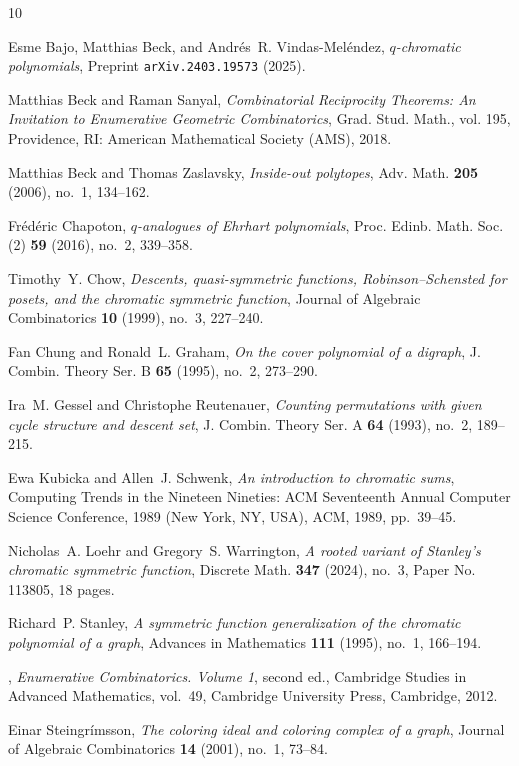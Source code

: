 \documentclass[11pt]{amsart}
\begin{document}
\begin{thebibliography}{10}

Esme Bajo, Matthias Beck, and Andrés~R. Vindas-Meléndez, \emph{$q$-chromatic
  polynomials}, Preprint {\tt arXiv.2403.19573} (2025).

Matthias Beck and Raman Sanyal, \emph{Combinatorial {R}eciprocity {T}heorems:
  {An} {I}nvitation to {E}numerative {G}eometric {C}ombinatorics}, Grad. Stud.
  Math., vol. 195, Providence, RI: American Mathematical Society (AMS), 2018.

Matthias Beck and Thomas Zaslavsky, \emph{Inside-out polytopes}, Adv. Math.
  \textbf{205} (2006), no.~1, 134--162.

Fr\'{e}d\'{e}ric Chapoton, \emph{{$q$}-analogues of {E}hrhart polynomials},
  Proc. Edinb. Math. Soc. (2) \textbf{59} (2016), no.~2, 339--358.

Timothy~Y. Chow, \emph{Descents, quasi-symmetric functions,
  {R}obinson--{S}chensted for posets, and the chromatic symmetric function},
  Journal of Algebraic Combinatorics \textbf{10} (1999), no.~3, 227--240.

Fan Chung and Ronald~L. Graham, \emph{On the cover polynomial of a digraph}, J.
  Combin. Theory Ser. B \textbf{65} (1995), no.~2, 273--290.

Ira~M. Gessel and Christophe Reutenauer, \emph{Counting permutations with given
  cycle structure and descent set}, J. Combin. Theory Ser. A \textbf{64}
  (1993), no.~2, 189--215.

Ewa Kubicka and Allen~J. Schwenk, \emph{An introduction to chromatic sums},
  Computing Trends in the Nineteen Nineties: ACM Seventeenth Annual Computer
  Science Conference, 1989 (New York, NY, USA), ACM, 1989, pp.~39--45.

Nicholas~A. Loehr and Gregory~S. Warrington, \emph{A rooted variant of
  {S}tanley's chromatic symmetric function}, Discrete Math. \textbf{347}
  (2024), no.~3, Paper No. 113805, 18 pages.

Richard~P. Stanley, \emph{A symmetric function generalization of the chromatic
  polynomial of a graph}, Advances in Mathematics \textbf{111} (1995), no.~1,
  166--194.

\bysame, \emph{Enumerative {C}ombinatorics. {V}olume 1}, second ed., Cambridge
  Studies in Advanced Mathematics, vol.~49, Cambridge University Press,
  Cambridge, 2012.

Einar Steingr{\'i}msson, \emph{The coloring ideal and coloring complex of a
  graph}, Journal of Algebraic Combinatorics \textbf{14} (2001), no.~1, 73--84.

\end{thebibliography}
\end{document}
